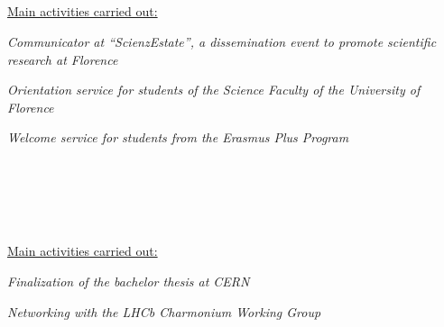 \begin{cvcontent}
  \\ [4mm]
  \\ [0.5mm]
  \\ [1.5mm]
  \\ [1.5mm]
  {\normalsize \color{maincolor} \ul{Main activities carried out:}\\ [1.5mm]
  \begin{itemize*}[label=\textcolor{iconcolor}{\textbullet}]
    \item \emph{Communicator at ``ScienzEstate'', a dissemination 
      event to promote scientific research at Florence}\\ [0.5mm]
    \item \emph{Orientation service for students of the Science 
      Faculty of the University of Florence}\\ [0.5mm]
    \item \emph{Welcome service for students from the Erasmus 
      Plus Program}
  \end{itemize*}}
  \\ [4mm]
  \\ [0.5mm]
  \\ [1.5mm]
  \\ [1.5mm]
  {\normalsize \color{maincolor} \ul{Main activities carried out:}\\ [1.5mm]
  \begin{itemize*}[label=\textcolor{iconcolor}{\textbullet}]
    \item \emph{Finalization of the bachelor thesis at CERN}\\ [0.5mm]
    \item \emph{Networking with the LHCb Charmonium Working Group}
  \end{itemize*}}

\end{cvcontent}
